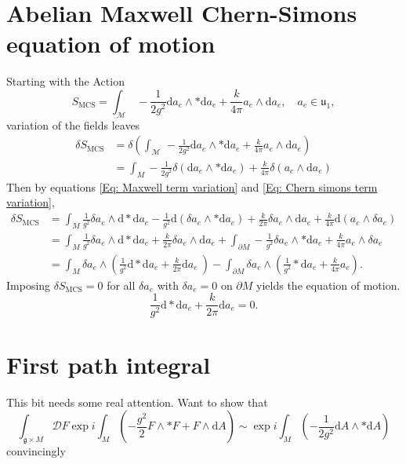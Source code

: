 \documentclass{article}
\begin{document}
\section{Abelian Maxwell Chern-Simons equation of motion}
\label{appendixamcseom}
Starting with the Action
\begin{equation}
    S_{\text{MCS}} = \int_{\mathcal{M}} \, -\frac{1}{2g^{2}} \mathrm{d}a_{e}\wedge * \mathrm{d}a_{e} + \frac{k}{4\pi}a_{e}\wedge \mathrm{d}a_{e},\quad a_{e}\in \mathfrak{u_{1}},
\end{equation}
variation of the fields leaves
\begin{align}
    \delta S_{\text{MCS}} &= \delta \left(\int_{\mathcal{M}} \, -\frac{1}{2g^{2}} \mathrm{d}a_{e}\wedge * \mathrm{d}a_{e} + \frac{k}{4\pi}a_{e}\wedge \mathrm{d}a_{e} \right)\nonumber \\
    &= \int_{M}-\frac{1}{2g^{2}}\delta\left(\mathrm{d}a_{e}\wedge * \mathrm{d}a_{e}\right)+\frac{k}{4\pi}\delta\left(a_{e}\wedge \mathrm{d}a_{e}\right)\nonumber
\end{align}
Then by equations \eqref{Eq: Maxwell term variation} and \eqref{Eq: Chern simons term variation}, 
\begin{align}
    \delta S_{\text{MCS}} &=\int_{M} \frac{1}{g^{2}}\delta a_{e}\wedge\mathrm{d}* \mathrm{d}a_{e} - \frac{1}{g^{2}}\mathrm{d}\left(\delta a_{e}\wedge * \mathrm{d}a_{e}\right) + \frac{k}{2\pi}\delta a_{e}\wedge \mathrm{d}a_{e} + \frac{k}{4\pi}\mathrm{d}\left(a_{e}\wedge \delta a_{e} \right)\nonumber\\
    &= \int_{M} \frac{1}{g^{2}}\delta a_{e}\wedge \mathrm{d}* \mathrm{d}a_{e} + \frac{k}{2\pi}\delta a_{e}\wedge \mathrm{d}a_{e} + \int_{\partial M}-\frac{1}{g^{2}}\delta a_{e}\wedge *\mathrm{d}a_{e} + \frac{k}{4\pi}a_{e}\wedge \delta a_{e}\nonumber\\
    &= \int_{M}\delta a_{e}\wedge \left(\frac{1}{g^{2}}\mathrm{d}* \mathrm{d}a_{e} + \frac{k}{2\pi}\mathrm{d}a_{e}\ \right)-\int_{\partial M}\delta a_{e}\wedge \left(\frac{1}{g^{2}}*\mathrm{d}a_{e} + \frac{k}{4\pi}a_{e}\right)\nonumber.
\end{align}
Imposing $\delta S_{\text{MCS}} = 0$ for all $\delta a_{e}$ with $\delta a_{e}=0$ on $\partial M$ yields the equation of motion.
\begin{equation}
    \frac{1}{g^{2}}\mathrm{d}*\mathrm{d}a_{e} + \frac{k}{2\pi}\mathrm{d}a_{e}=0.
\end{equation}

\section{First path integral}
\label{appendixfirstpathintegral}
\color{red}This bit needs some real attention. Want to show that 
\begin{equation}
    \boxed{
    \int_{\mathfrak{g}\times M}\mathcal{D}F\exp i \int_{M}\left(-\frac{g^{2}}{2}F\wedge * F + F\wedge \mathrm{d}A \right)\sim \exp i \int_{M}\left(-\frac{1}{2g^{2}}\mathrm{d}A\wedge *\mathrm{d}A\right)
    }
\end{equation}
convincingly
\color{black}
\end{document}
